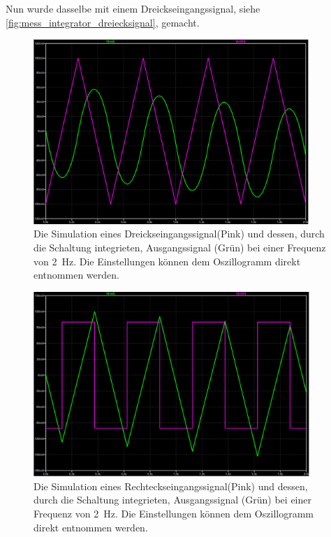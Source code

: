 \documentclass[12pt,english,ngerman]{scrartcl}
\begin{document}
Nun wurde dasselbe mit einem Dreickseingangssignal, siehe
\autoref{fig:mess_integrator_dreiecksignal}, gemacht.

\begin{figure}[H]
  \centering
    \includegraphics[width=\linewidth, height=7cm]{./figures/integrator/sim/mit_stufe/dreieck100mv_500ms.png}
  \caption{Die Simulation eines Dreickseingangssignal(Pink) und dessen, durch die Schaltung integrieten,
    Ausgangssignal (Grün) bei einer Frequenz von \SI{2}{\hertz}. Die
  Einstellungen können dem Oszillogramm direkt entnommen werden.}
  \label{fig:sim_int_stufe_tri}
\end{figure}

\begin{figure}[H]
  \centering
    \includegraphics[width=\linewidth, height=7cm]{./figures/integrator/sim/mit_stufe/rechteck100mv_500ms.png}
  \caption{Die Simulation eines Rechteckseingangssignal(Pink) und dessen, durch die Schaltung integrieten,
  Ausgangssignal (Grün) bei einer Frequenz von \SI{2}{\hertz}. Die
  Einstellungen können dem Oszillogramm direkt entnommen werden.}
  \label{fig:sim_int_stufe_rect}
\end{figure}
\end{document}
